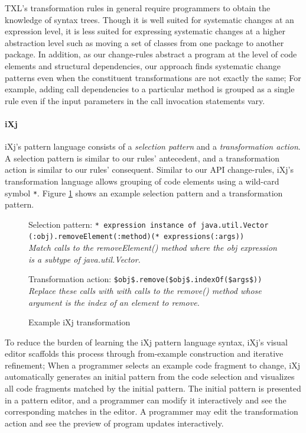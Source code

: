 \documentclass[runningheads,a4paper]{llncs}
\newcommand{\codefont}[1]{\footnotesize{\texttt{#1}}\normalsize}
\begin{document}
TXL's transformation rules in general require programmers to obtain the knowledge of syntax trees. Though it is well suited for systematic changes at an expression level, it is less suited for expressing systematic changes at a higher abstraction level such as moving a set of classes from one package to another package. In addition, as our change-rules abstract a program at the level of code elements and structural dependencies, our approach finds systematic change patterns even when the constituent transformations are not exactly the same; For example, adding call dependencies to a particular method is grouped as a single rule even if the input parameters in the call invocation statements vary. 

\paragraph{iXj} 
iXj's pattern language consists of a {\em selection pattern} and a {\em transformation action}. A selection pattern is similar to our rules' antecedent, and a transformation action is similar to our rules' consequent. Similar to our API change-rules, iXj's transformation language allows grouping of code elements using a wild-card symbol \codefont{*}. Figure \ref{ixj_example} shows an example selection pattern and a transformation pattern. 

\begin{figure} 
Selection pattern: \codefont{* expression instance of java.util.Vector (:obj).removeElement(:method)(* expressions(:args))} \\
\it{Match calls to the {removeElement()} method where the {obj} expression is a subtype of {java.util.Vector}.} 

Transformation action: \codefont{\$obj\$.remove(\$obj\$.indexOf(\$args\$))} \\
\it{Replace these calls with with calls to the {remove()} method whose argument is the index of an element to remove.} 

\caption{Example iXj transformation} 
\label{ixj_example} 
\end{figure} 


To reduce the burden of learning the iXj pattern language syntax, iXj's visual editor scaffolds this process through from-example construction and iterative refinement; When a programmer selects an example code fragment to change, iXj automatically generates an initial pattern from the code selection and visualizes all code fragments matched by the initial pattern. The initial pattern is presented in a pattern editor, and a programmer can modify it interactively and see the corresponding matches in the editor. A programmer may edit the transformation action and see the preview of program updates interactively. 
\end{document}
